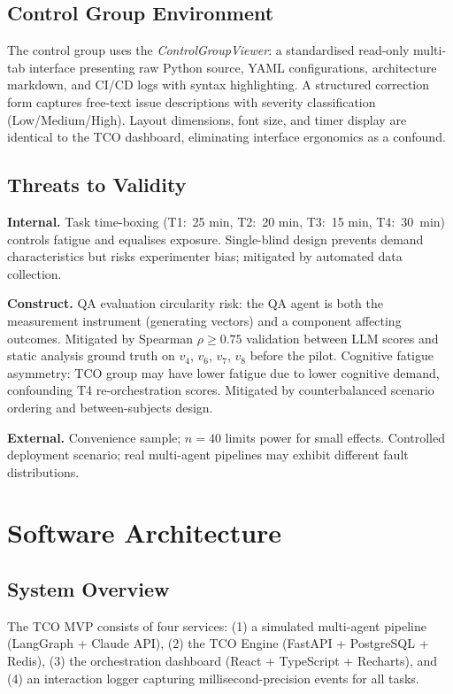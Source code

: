 \documentclass[manuscript,review,anonymous]{acmart}
\begin{document}
\subsection{Control Group Environment}

The control group uses the \textit{ControlGroupViewer}: a standardised read-only
multi-tab interface presenting raw Python source, YAML configurations, architecture
markdown, and CI/CD logs with syntax highlighting. A structured correction form
captures free-text issue descriptions with severity classification (Low/Medium/High).
Layout dimensions, font size, and timer display are identical to the TCO dashboard,
eliminating interface ergonomics as a confound.

\subsection{Threats to Validity}

\noindent \textbf{Internal.} Task time-boxing (T1:~25 min, T2:~20 min, T3:~15 min,
T4:~30~min) controls fatigue and equalises exposure. Single-blind design prevents
demand characteristics but risks experimenter bias; mitigated by automated
data collection.

\noindent \textbf{Construct.} QA evaluation circularity risk: the QA agent is both the
measurement instrument (generating vectors) and a component affecting outcomes.
Mitigated by Spearman $\rho \geq 0.75$ validation between LLM scores and static
analysis ground truth on $v_4$, $v_6$, $v_7$, $v_8$ before the pilot.
Cognitive fatigue asymmetry: TCO group may have lower fatigue due to lower cognitive
demand, confounding T4 re-orchestration scores. Mitigated by counterbalanced scenario
ordering and between-subjects design.

\noindent \textbf{External.} Convenience sample; $n = 40$ limits power for small
effects. Controlled deployment scenario; real multi-agent pipelines may exhibit
different fault distributions.

\section{Software Architecture}

\subsection{System Overview}

The TCO MVP consists of four services: (1) a simulated multi-agent pipeline
(LangGraph + Claude API), (2) the TCO Engine (FastAPI + PostgreSQL + Redis),
(3) the orchestration dashboard (React + TypeScript + Recharts), and (4) an
interaction logger capturing millisecond-precision events for all tasks.
\end{document}
